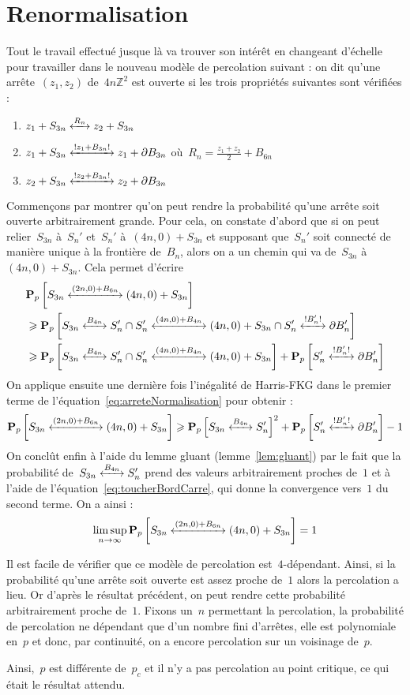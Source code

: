\section{Renormalisation}\label{sec:renormalisation}

	Tout le travail effectué jusque là va trouver son intérêt en changeant d'échelle pour travailler dans le nouveau modèle de percolation suivant : on dit qu'une arrête~$(z_1, z_2)$ de~$4n\mathbb{Z}^2$ est ouverte si les trois propriétés suivantes sont vérifiées :
	\begin{enumerate}[label=(\roman*)]
		\item $\relie[R_n]{z_1 + S_{3n}}{z_2 + S_{3n}}$
		\item $\relie*[z_1 + B_{3n}]{z_1 + S_{3n}}{z_1 + \partial B_{3n}}$ \hfil où~$R_n = \frac{z_1 + z_2}{2} + B_{6n}$
		\item $\relie*[z_2 + B_{3n}]{z_2 + S_{3n}}{z_2 + \partial B_{3n}}$ 
	\end{enumerate}
	Commençons par montrer qu'on peut rendre la probabilité qu'une arrête soit ouverte arbitrairement grande. Pour cela, on constate d'abord que si on peut relier~$S_{3n}$ à~$S_n'$ et~$S_n'$ à~$(4n, 0) + S_{3n}$ et supposant que~$S_n'$ soit connecté de manière unique à la frontière de~$B_n$, alors on a un chemin qui va de~$S_{3n}$ à~$(4n, 0) + S_{3n}$. Cela permet d'écrire
	\begin{align}
		& \Pp{\relie[(2n, 0) + B_{6n}]{S_{3n}}{(4n, 0) + S_{3n}}} \nonumber \\
		& \geq \Pp{ \relie[B_{4n}]{S_{3n}}{S_n'} \cap \relie[(4n, 0) + B_{4n}]{S_n'}{(4n, 0) + S_{3n}} \cap \relie*[B_n']{S_n'}{\partial B_n'} } \nonumber \\
		& \geq \Pp{ \relie[B_{4n}]{S_{3n}}{S_n'} \cap \relie[(4n, 0) + B_{4n}]{S_n'}{(4n, 0) + S_{3n}}} + \Pp{\relie*[B_n']{S_n'}{\partial B_n'}} \label{eq:arreteNormalisation}
	\end{align}
	On applique ensuite une dernière fois l'inégalité de Harris-FKG dans le premier terme de l'équation~\ref{eq:arreteNormalisation} pour obtenir :
	\[
		\Pp{\relie[(2n, 0) + B_{6n}]{S_{3n}}{(4n, 0) + S_{3n}}}	\geq \Pp{ \relie[B_{4n}]{S_{3n}}{S_n'} }^2 + \Pp{\relie*[B_n']{S_n'}{\partial B_n'}}  - 1
	\]
	On conclût enfin à l'aide du lemme gluant (lemme~\ref{lem:gluant}) par le fait que la probabilité de~$\relie[B_{4n}]{S_{3n}}{S_n'}$ prend des valeurs arbitrairement proches de~$1$ et à l'aide de l'équation~\eqref{eq:toucherBordCarre}, qui donne la convergence vers~$1$ du second terme. On a ainsi :
	\[
		\limsup_{n \to \infty} \Pp{\relie[(2n, 0) + B_{6n}]{S_{3n}}{(4n, 0) + S_{3n}}} = 1
	\]

	Il est facile de vérifier que ce modèle de percolation est~$4$-dépendant. Ainsi, si la probabilité qu'une arrête soit ouverte est assez proche de~$1$ alors la percolation a lieu. Or d'après le résultat précédent, on peut rendre cette probabilité arbitrairement proche de~$1$. Fixons un~$n$ permettant la percolation, la probabilité de percolation ne dépendant que d'un nombre fini d'arrêtes, elle est polynomiale en~$p$ et donc, par continuité, on a encore percolation sur un voisinage de~$p$.

	Ainsi,~$p$ est différente de~$p_c$ et il n'y a pas percolation au point critique, ce qui était le résultat attendu.
